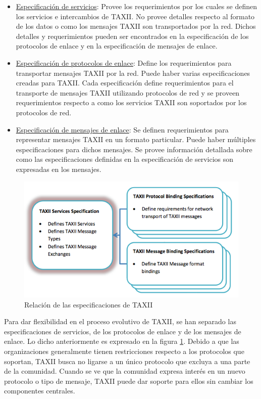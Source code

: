 \begin{itemize}
  \item \underline{Especificación de servicios}: Provee los requerimientos por los cuales se 
  definen los servicios e intercambios de TAXII. No provee detalles respecto al 
  formato de los datos o como los mensajes TAXII son transportados por la red. 
  Dichos detalles y requerimientos pueden ser encontrados en la especificación 
  de los protocolos de enlace y en la especificación de mensajes de enlace.
 \item \underline{Especificación de protocolos de enlace}: Define los requerimientos para 
 transportar mensajes TAXII por la red. Puede haber varias especificaciones 
 creadas para TAXII. Cada especificación define requerimientos para el 
 transporte de mensajes TAXII utilizando protocolos de red y se proveen 
 requerimientos respecto a como los servicios TAXII son soportados por los 
 protocolos de red.
 \item \underline{Especificación de mensajes de enlace}: Se definen requerimientos para 
 representar mensajes TAXII en un formato particular. Puede haber múltiples 
 especificaciones para dichos mensajes. Se provee información detallada sobre 
 como las especificaciones definidas en la especificación de servicios son 
 expresadas en los mensajes.
\end{itemize}

\begin{figure}[ht!]
  \centering
  	\label{fig.taxii_spec}
    \includegraphics[width=150mm]{./images/TAXIIEspecification.png}
    \caption{Relación de las especificaciones de TAXII \protect\cite{b1}}
\end{figure}

Para dar flexibilidad en el proceso evolutivo de TAXII, se han separado las 
especificaciones de servicios, de los protocolos de enlace y de los mensajes de 
enlace. Lo dicho anteriormente es expresado en la figura \ref{fig.taxii_spec}.
Debido a que las organizaciones generalmente tienen restricciones 
respecto a los protocolos que soportan, TAXII busca no ligarse a un único 
protocolo que excluya a una parte de la comunidad. Cuando se ve que la comunidad 
expresa interés en un nuevo protocolo o tipo de mensaje, TAXII puede dar soporte 
para ellos sin cambiar los componentes centrales.\\

